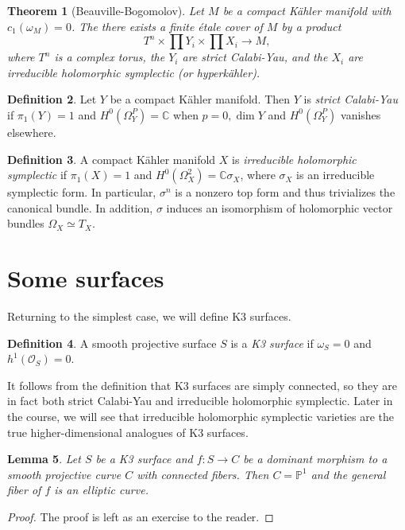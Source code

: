 \documentclass[leqno, openany]{memoir}
\newtheorem{thm}{Theorem}[section]
\newtheorem{lem}[thm]{Lemma}
\theoremstyle{definition}
\newtheorem{defn}[thm]{Definition}
\theoremstyle{remark}
\theoremstyle{plain}
\theoremstyle{definition}
\theoremstyle{remark}
\newcommand{\C}{\mathbb{C}}
\renewcommand{\P}{\mathbb{P}}
\newcommand{\mc}[1]{\mathcal{#1}}
\begin{document}
\begin{thm}[Beauville-Bogomolov]
    Let $M$ be a compact K\"ahler manifold with $c_1(\omega_M) = 0$. The there exists a finite \'etale cover of $M$ by a product
    \[ T^n \times \prod Y_i \times \prod X_i \to M, \]
    where $T^n$ is a complex torus, the $Y_i$ are \textit{strict Calabi-Yau}, and the $X_i$ are \textit{irreducible holomorphic symplectic} (or hyperk\"ahler).  
\end{thm}

\begin{defn}
    Let $Y$ be a compact K\"ahler manifold. Then $Y$ is \textit{strict Calabi-Yau} if $\pi_1(Y) = 1$ and $H^0(\Omega^P_Y) = \C$ when $p = 0, \dim Y$ and $H^0(\Omega^P_Y)$ vanishes elsewhere.
\end{defn}

\begin{defn}
    A compact K\"ahler manifold $X$ is \textit{irreducible holomorphic symplectic} if $\pi_1(X) = 1$ and $H^0(\Omega^2_X) = \C \sigma_X$, where $\sigma_X$ is an irreducible symplectic form. In particular, $\sigma^n$ is a nonzero top form and thus trivializes the canonical bundle. In addition, $\sigma$ induces an isomorphism of holomorphic vector bundles $\Omega_X \simeq T_X$.
\end{defn}

\section{Some surfaces}%
\label{sec:some_surfaces}

Returning to the simplest case, we will define K3 surfaces.
\begin{defn}
    A smooth projective surface $S$ is a \textit{K3 surface} if $\omega_S = 0$ and $h^1(\mc{O}_S) = 0$. 
\end{defn}
It follows from the definition that K3 surfaces are simply connected, so they are in fact both strict Calabi-Yau and irreducible holomorphic symplectic. Later in the course, we will see that irreducible holomorphic symplectic varieties are the true higher-dimensional analogues of K3 surfaces.

\begin{lem}
    Let $S$ be a K3 surface and $f \colon S \to C$ be a dominant morphism to a smooth projective curve $C$ with connected fibers. Then $C = \P^1$ and the general fiber of $f$ is an elliptic curve.
\end{lem}

\begin{proof}
    The proof is left as an exercise to the reader.
\end{proof}
\end{document}
